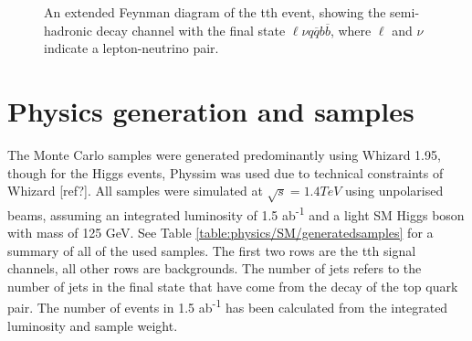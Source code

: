 \begin{figure}
	\caption{An extended Feynman diagram of the tth event, showing the semi-hadronic decay channel  with the final state $\ell\nu q\overline{q}b\overline{b}$, where $\ell$ and $\nu$ indicate a lepton-neutrino pair.}
	\label{figure:physics/SM/feynman-tth-semileptonic}
\end{figure}

\section{Physics generation and samples}
The Monte Carlo samples were generated predominantly using Whizard 1.95, though for the Higgs events, Physsim was used due to technical constraints of Whizard [ref?]. All samples were simulated at $\sqrt{s} = 1.4TeV$ using unpolarised beams, assuming an integrated luminosity of 1.5 ab\textsuperscript{-1} and a light \acrlong{SM} Higgs boson with mass of 125 GeV. See Table \ref{table:physics/SM/generatedsamples} for a summary of all of the used samples. The first two rows are the tth signal channels, all other rows are backgrounds. The number of jets refers to the number of jets in the final state that have come from the decay of the top quark pair. The number of events in 1.5 ab\textsuperscript{-1} has been calculated from the integrated luminosity and sample weight.

